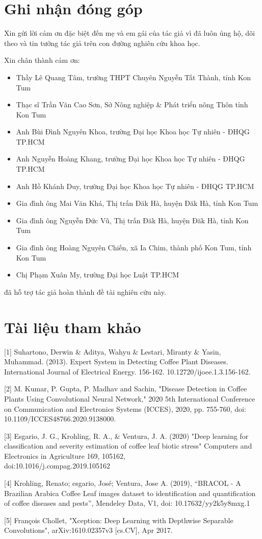 \documentclass[a4paper,14pt]{extarticle}
\begin{document}
\section{Ghi nhận đóng góp}
Xin gửi lời cảm ơn đặc biệt đến mẹ và em gái của tác giả vì đã luôn ủng hộ, dõi theo và tin tưởng tác giả trên con đường nghiên cứu khoa học.

\null

Xin chân thành cảm ơn:
\begin{itemize}
	\item Thầy Lê Quang Tâm, trường THPT Chuyên Nguyễn Tất Thành, tỉnh Kon Tum
	\item Thạc sĩ Trần Văn Cao Sơn, Sở Nông nghiệp \& Phát triển nông Thôn tỉnh Kon Tum
	\item Anh Bùi Đình Nguyên Khoa, trường Đại học Khoa học Tự nhiên - ĐHQG TP.HCM
	\item Anh Nguyễn Hoàng Khang, trường Đại học Khoa học Tự nhiên - ĐHQG TP.HCM
	\item Anh Hồ Khánh Duy, trường Đại học Khoa học Tự nhiên - ĐHQG TP.HCM
	\item Gia đình ông Mai Văn Khá, Thị trấn Đăk Hà, huyện Đăk Hà, tỉnh Kon Tum
	\item Gia đình ông Nguyễn Đức Vũ, Thị trấn Đăk Hà, huyện Đăk Hà, tỉnh Kon Tum
	\item Gia đình ông Hoàng Nguyên Chiến, xã Ia Chim, thành phố Kon Tum, tỉnh Kon Tum
	\item Chị Phạm Xuân My, trường Đại học Luật TP.HCM
\end{itemize}
	đã hỗ trợ tác giả hoàn thành đề tài nghiên cứu này.

\section{Tài liệu tham khảo}
[1] Suhartono, Derwin \& Aditya, Wahyu \& Lestari, Miranty \& Yasin, Muhammad. (2013). Expert System in Detecting Coffee Plant Diseases. International Journal of Electrical Energy. 156-162. 10.12720/ijoee.1.3.156-162.

[2] M. Kumar, P. Gupta, P. Madhav and Sachin, "Disease Detection in Coffee Plants Using Convolutional Neural Network," 2020 5th International Conference on Communication and Electronics Systems (ICCES), 2020, pp. 755-760, doi: 10.1109/ICCES48766.2020.9138000.

[3] Esgario, J. G., Krohling, R. A., \& Ventura, J. A. (2020) "Deep learning for classification and severity estimation of coffee leaf biotic stress" Computers and Electronics in Agriculture 169, 105162,\\doi:10.1016/j.compag.2019.105162

[4] Krohling, Renato; esgario, José; Ventura, Jose A. (2019), “BRACOL - A Brazilian Arabica Coffee Leaf images dataset to identification and quantification of coffee diseases and pests”, Mendeley Data, V1, doi: 10.17632/yy2k5y8mxg.1

[5] François Chollet, "Xception: Deep Learning with Depthwise Separable Convolutions", arXiv:1610.02357v3 [cs.CV], Apr 2017.
\end{document}
